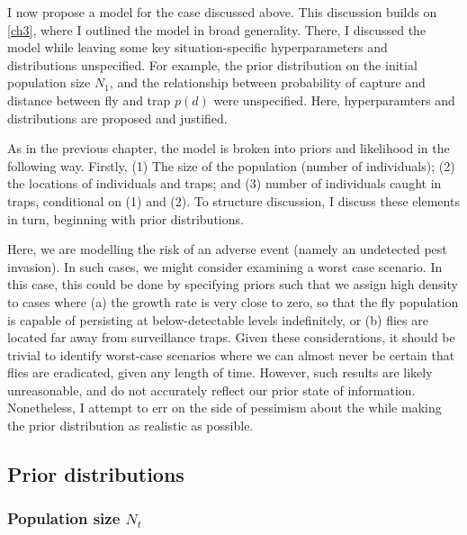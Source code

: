 \documentclass[
  oneside]{book}
\begin{document}
I now propose a model for the case discussed above. This discussion builds on \ref{ch3}, where I outlined the model in broad generality. There, I discussed the model while leaving some key situation-specific hyperparameters and distributions unspecified. For example, the prior distribution on the initial population size \(N_1\), and the relationship between probability of capture and distance between fly and trap \(p(d)\) were unspecified. Here, hyperparamters and distributions are proposed and justified.

As in the previous chapter, the model is broken into priors and likelihood in the following way. Firstly, (1) The size of the population (number of individuals); (2) the locations of individuals and traps; and (3) number of individuals caught in traps, conditional on (1) and (2). To structure discussion, I discuss these elements in turn, beginning with prior distributions.

Here, we are modelling the risk of an adverse event (namely an undetected pest invasion). In such cases, we might consider examining a worst case scenario. In this case, this could be done by specifying priors such that we assign high density to cases where (a) the growth rate is very close to zero, so that the fly population is capable of persisting at below-detectable levels indefinitely, or (b) flies are located far away from surveillance traps. Given these considerations, it should be trivial to identify worst-case scenarios where we can almost never be certain that flies are eradicated, given any length of time. However, such results are likely unreasonable, and do not accurately reflect our prior state of information. Nonetheless, I attempt to err on the side of pessimism about the while making the prior distribution as realistic as possible.

\hypertarget{prior-distributions}{%
\subsection{Prior distributions}\label{prior-distributions}}

\hypertarget{popn-size}{%
\subsubsection{\texorpdfstring{Population size \(N_t\)}{Population size N\_t}}\label{popn-size}}
\end{document}
